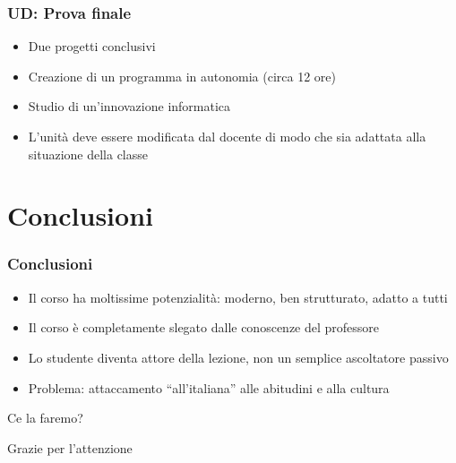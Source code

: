 \documentclass{beamer}
\begin{document}
\begin{frame}
  \frametitle{UD: Prova finale}

  \begin{itemize}
    \item Due progetti conclusivi
    \item Creazione di un programma in autonomia (circa 12 ore)
    \item Studio di un'innovazione informatica
  \end{itemize}

  \begin{itemize}
    \item L'unità deve essere modificata dal docente di modo che sia adattata alla situazione della classe
  \end{itemize}
\end{frame}

\section{Conclusioni}

\begin{frame}
  \frametitle{Conclusioni}

  \begin{itemize}
    \item Il corso ha moltissime potenzialità: moderno, ben strutturato, adatto a tutti
    \item Il corso è completamente slegato dalle conoscenze del professore
    \item Lo studente diventa attore della lezione, non un semplice ascoltatore passivo
  \end{itemize}
  \begin{itemize}
    \item Problema: attaccamento ``all'italiana'' alle abitudini e alla cultura
  \end{itemize}

  \vspace{1em}

  \centerline{Ce la faremo?}
\end{frame}

\begin{frame}
  \Huge{\centerline{Grazie per l'attenzione}}
\end{frame}

\end{document}
